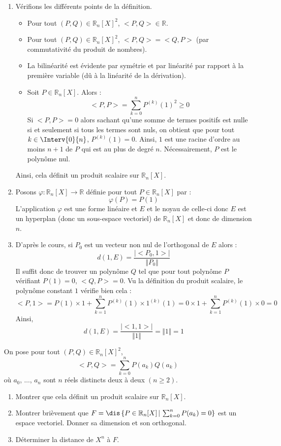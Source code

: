 \documentclass[a4paper,10pt]{report}
\begin{document}
\corr \begin{enumerate}
\item Vérifions les différents points de la définition.

\begin{itemize}
\item Pour tout $(P,Q) \in \mathbb{R}_n[X]^2$, $<P,Q> \in \mathbb{R}$.
\item Pour tout $(P,Q) \in \mathbb{R}_n[X]^2$, $<P,Q>= <Q,P>$ (par commutativité du produit de nombres).
\item La bilinéarité est évidente par symétrie et par linéarité par rapport à la première variable (dû à la linéarité de la dérivation).
\item Soit $P \in \mathbb{R}_n[X]$. Alors :
$$ <P,P> = \sum_{k=0}^{n} P^{(k)}(1)^2 \geq 0$$
Si $<P,P>=0$ alors sachant qu'une somme de termes positifs est nulle si et seulement si tous les termes sont nuls, on obtient que pour tout $k \in \Interv{0}{n}$, $P^{(k)}(1)=0$. Ainsi, $1$ est une racine d'ordre au moins $n+1$ de $P$ qui est au plus de degré $n$. Nécessairement, $P$ est le polynôme nul. 
\end{itemize}
Ainsi, cela définit un produit scalaire sur $\mathbb{R}_n[X]$.
\item Posons $\varphi : \mathbb{R}_n[X] \rightarrow \mathbb{R}$ définie pour tout $P \in \mathbb{R}_n[X]$ par :
$$ \varphi(P)= P(1)$$
L'application $\varphi$ est une forme linéaire et $E$ et le noyau de celle-ci donc $E$ est un hyperplan (donc un sous-espace vectoriel) de $\mathbb{R}_n[X]$ et donc de dimension $n$.
\item D'après le cours, si $P_0$ est un vecteur non nul de l'orthogonal de $E$ alors :
$$ d(1,E) = \dfrac{\vert <P_0,1> \vert }{\Vert P_0 \Vert}$$
Il suffit donc de trouver un polynôme $Q$ tel que pour tout polynôme $P$ vérifiant $P(1)=0$, $<Q,P>=0$. Vu la définition du produit scalaire, le polynôme constant $1$ vérifie bien cela :
$$ <P,1> = P(1) \times 1 + \sum_{k=1}^n P^{(k)}(1) \times 1^{(k)}(1) = 0\times 1 + \sum_{k=1}^n P^{(k)}(1) \times 0 = 0$$
Ainsi,
$$ d(1,E) = \dfrac{\vert <1,1> \vert }{\Vert 1 \Vert} = \Vert 1 \Vert = 1$$
\end{enumerate}


\begin{Exercice}{} On pose pour tout $(P,Q) \in \mathbb{R}_n[X]^2$,
$$ <P,Q> = \sum_{k=0}^n P(a_k) Q(a_k)$$
où $a_0$, $\ldots$, $a_n$ sont $n$ réels distincts deux à deux $(n \geq 2)$.
\begin{enumerate}
\item Montrer que cela définit un produit scalaire sur $\mathbb{R}_n[X]$.
\item Montrer brièvement que $F= \dis \left\lbrace P \in \mathbb{R}_n[X] \, \vert \, \sum_{k=0}^n P(a_k)=0 \right\rbrace$ est un espace vectoriel. Donner sa dimension et son orthogonal.
\item Déterminer la distance de $X^n$ à $F$.
\end{enumerate}
\end{Exercice}
\end{document}
